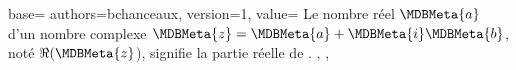 {
  base={
    authors={bchanceaux},
    version={1},
    value={%
      Le nombre réel $\MDBMeta{a}$ d’un nombre complexe $\MDBMeta{z} = \MDBMeta{a} + \MDBMeta{i} \MDBMeta{b}$, noté $\Re(\MDBMeta{z}$), signifie la partie réelle de .
    },
  },
}